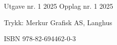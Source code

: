 



\pagestyle{empty}
Utgave nr. 1 2025 \os
Opplag nr. 1 2025 \vsk


Trykk: Merkur Grafisk AS, Langhus\vsk

ISBN 978-82-694462-0-3 \vsk

\lic

\newpage	



